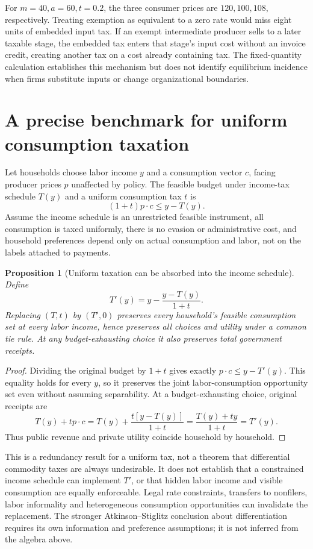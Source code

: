 \documentclass[11pt,a4paper]{article}
\newtheorem{proposition}[theorem]{Proposition}
\begin{document}
For $m=40,a=60,t=0.2$, the three consumer prices are $120,100,108$, respectively. Treating exemption as equivalent to a zero rate would miss eight units of embedded input tax. If an exempt intermediate producer sells to a later taxable stage, the embedded tax enters that stage's input cost without an invoice credit, creating another tax on a cost already containing tax. The fixed-quantity calculation establishes this mechanism but does not identify equilibrium incidence when firms substitute inputs or change organizational boundaries.

\section{A precise benchmark for uniform consumption taxation}
Let households choose labor income $y$ and a consumption vector $c$, facing producer prices $p$ unaffected by policy. The feasible budget under income-tax schedule $T(y)$ and a uniform consumption tax $t$ is
\[
 (1+t)p\cdot c\le y-T(y).
\]
Assume the income schedule is an unrestricted feasible instrument, all consumption is taxed uniformly, there is no evasion or administrative cost, and household preferences depend only on actual consumption and labor, not on the labels attached to payments.

\begin{proposition}[Uniform taxation can be absorbed into the income schedule]
Define
\[
 T'(y)=y-\frac{y-T(y)}{1+t}.
\]
Replacing $(T,t)$ by $(T',0)$ preserves every household's feasible consumption set at every labor income, hence preserves all choices and utility under a common tie rule. At any budget-exhausting choice it also preserves total government receipts.
\end{proposition}
\begin{proof}
Dividing the original budget by $1+t$ gives exactly $p\cdot c\le y-T'(y)$. This equality holds for every $y$, so it preserves the joint labor-consumption opportunity set even without assuming separability. At a budget-exhausting choice, original receipts are
\[
 T(y)+tp\cdot c=T(y)+\frac{t[y-T(y)]}{1+t}
 =\frac{T(y)+ty}{1+t}=T'(y).
\]
Thus public revenue and private utility coincide household by household.
\end{proof}

This is a redundancy result for a uniform tax, not a theorem that differential commodity taxes are always undesirable. It does not establish that a constrained income schedule can implement $T'$, or that hidden labor income and visible consumption are equally enforceable. Legal rate constraints, transfers to nonfilers, labor informality and heterogeneous consumption opportunities can invalidate the replacement. The stronger Atkinson--Stiglitz conclusion about differentiation requires its own information and preference assumptions; it is not inferred from the algebra above.
\end{document}
